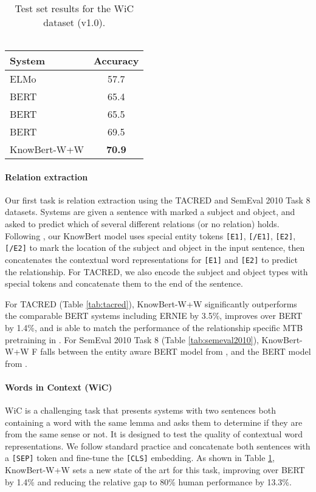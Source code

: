 \documentclass[11pt,a4paper]{article}
\newcommand{\KBS}[0]{KnowBert }
\newcommand{\KWANDW}[0]{KnowBert-W+W}
\newcommand{\KWANDWS}[0]{KnowBert-W+W }
\newcommand{\BBS}[0]{BERT }
\newcommand{\BB}[0]{BERT}
\newcommand{\BLS}[0]{BERT }
\newcommand{\BL}[0]{BERT}
\begin{document}
\begin{table}
\centering
\begin{tabular}[t]{l c}
\toprule
System & Accuracy \\
 \midrule
 ELMo & 57.7 \\
 \BB & 65.4 \\
 \BL & 65.5 \\
 \BL & 69.5 \\
 \KWANDW & \textbf{70.9} \\
\bottomrule
\end{tabular}
\caption{Test set results for the WiC dataset (v1.0). \\
\citet{Pilehvar2019WiCTW} \\
\citet{wang2019superglue}
}
\label{tab:wic}
\end{table}




\paragraph{Relation extraction} Our first task is relation extraction using the TACRED  \cite{Zhang2017PositionawareAA} and SemEval 2010 Task 8 \cite{Hendrickx2009SemEval2010T8} datasets.
Systems are given a sentence with marked a subject and object, and asked to predict which of several different relations (or no relation) holds.
Following \citet{Soares2019MatchingTB}, our \KBS model uses special entity tokens \texttt{[E1]}, \texttt{[/E1]}, \texttt{[E2]}, \texttt{[/E2]} to mark the location of the subject and object in the input sentence, then concatenates the contextual word representations for \texttt{[E1]} and \texttt{[E2]} to predict the relationship.
For TACRED, we also encode the subject and object types with special tokens and concatenate them to the end of the sentence.

For TACRED (Table \ref{tab:tacred}), \KWANDWS significantly outperforms the comparable \BBS systems including ERNIE by 3.5\%, improves over \BLS by 1.4\%, and is able to match the performance of the relationship specific MTB pretraining in \citet{Soares2019MatchingTB}.
For SemEval 2010 Task 8 (Table \ref{tab:semeval2010}), \KWANDWS F falls between the entity aware \BBS model from \citet{wang-etal-2019-extracting}, and the \BLS model from \citet{Soares2019MatchingTB}.

\paragraph{Words in Context (WiC)} WiC \cite{Pilehvar2019WiCTW} is a challenging task that presents systems with two sentences both containing a word with the same lemma and asks them to determine if they are from the same sense or not.  It is designed to test the quality of contextual word representations.  We follow standard practice and concatenate both sentences with a \texttt{[SEP]} token and fine-tune the \texttt{[CLS]} embedding.  As shown in Table \ref{tab:wic}, \KWANDWS sets a new state of the art for this task, improving over \BLS by 1.4\% and reducing the relative gap to 80\% human performance by 13.3\%.
\end{document}
